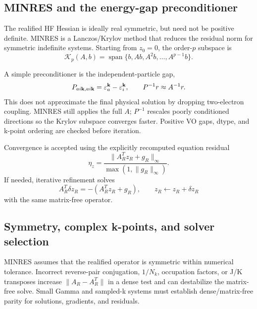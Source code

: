 \subsection{MINRES and the energy-gap preconditioner}

The realified HF Hessian is ideally real symmetric, but need not be positive
definite.  MINRES is a Lanczos/Krylov method that reduces the residual norm
for symmetric indefinite systems.  Starting from $z_0=0$, the order-$p$
subspace is
\begin{equation}
  \mathcal K_p(A,b)
  =\operatorname{span}\{b,Ab,A^2b,\ldots,A^{p-1}b\}.
  \label{eq:minres-krylov}
\end{equation}

A simple preconditioner is the independent-particle gap,
\begin{equation}
  P_{ai\mathbf{k},ai\mathbf{k}}=\varepsilon_a^{\mathbf{k}}-\varepsilon_i^{\mathbf{k}},
  \qquad P^{-1}r\approx A^{-1}r.
  \label{eq:gap-preconditioner}
\end{equation}
This does not approximate the final physical solution by dropping
two-electron coupling.  MINRES still applies the full $A$; $P^{-1}$ rescales
poorly conditioned directions so the Krylov subspace converges faster.
Positive VO gaps, dtype, and k-point ordering are checked before iteration.

Convergence is accepted using the explicitly recomputed equation residual
\begin{equation}
  \eta_z
  =\frac{\|A_R^Tz_R+g_R\|_\infty}
         {\max(1,\|g_R\|_\infty)}.
  \label{eq:scaled-z-residual}
\end{equation}
If needed, iterative refinement solves
\begin{equation}
  A_R^T\delta z_R=-\left(A_R^Tz_R+g_R\right),
  \qquad z_R\leftarrow z_R+\delta z_R
  \label{eq:iterative-refinement}
\end{equation}
with the same matrix-free operator.

\subsection{Symmetry, complex k-points, and solver selection}

MINRES assumes that the realified operator is symmetric within numerical
tolerance.  Incorrect reverse-pair conjugation, $1/N_k$, occupation factors,
or J/K transposes increase $\|A_R-A_R^T\|$ in a dense test and can destabilize
the matrix-free solve.  Small Gamma and sampled-k systems must establish
dense/matrix-free parity for solutions, gradients, and residuals.

